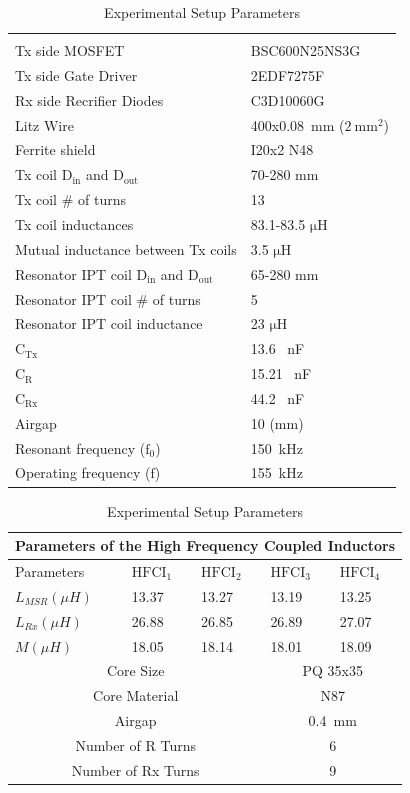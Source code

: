 \documentclass[journal]{IEEEtran}
\begin{document}
\begin{table}[h]
\centering
\caption{Experimental Setup Parameters}
\label{tab:experimetalsetupparameters}
\begin{tabular}{ll}
\hline \\
Tx side MOSFET       &   BSC600N25NS3G   \\
Tx side Gate Driver       &  2EDF7275F     \\
Rx side Recrifier Diodes       &  C3D10060G      \\
Litz Wire     & 400x0.08~mm ($\mathrm{2~mm^2}$)      \\
Ferrite shield   &   I20x2 N48     \\
Tx coil $\mathrm{D_{in}}$ and $\mathrm{D_{out}}$  &  70-280 mm\\
Tx coil \# of turns         &   13      \\
Tx coil inductances        &  83.1-83.5 $\mathrm{\mu H}$\\
Mutual inductance between Tx coils    &  3.5 $\mathrm{\mu H}$\\
Resonator IPT coil $\mathrm{D_{in}}$ and $\mathrm{D_{out}}$ &  65-280 mm\\
Resonator IPT coil \# of turns         &   5      \\
Resonator IPT coil inductance  & 23 $\mathrm{\mu H}$\\
$\mathrm{C_{Tx}}$         &   13.6 ~nF    \\
$\mathrm{C_{R}}$         &   15.21 ~nF   \\
$\mathrm{C_{Rx}}$        &   44.2 ~nF   \\
Airgap   &   10 (mm)     \\
Resonant frequency ($\mathrm{f_0}$)  &   150~kHz      \\
Operating frequency ($\mathrm{f}$)  &   155~kHz      \\
\hline
\end{tabular}

\begin{tabular}{lllll}
\\
\multicolumn{5}{c}{\textbf{Parameters of the High Frequency Coupled Inductors}} 
\\
\hline
\hline
Parameters & \textbf{$\mathrm{HFCI_{1}}$} &\textbf{$\mathrm{HFCI_{2}}$}& \textbf{$\mathrm{HFCI_{3}}$}& \textbf{$\mathrm{HFCI_{4}}$}\\ \hline
\textbf{$L_{MSR}(\mu H)$} & 13.37& 13.27  &  13.19&13.25 \\
\textbf{$L_{Rx}(\mu H)$}& 26.88&  26.85 &  26.89 &  27.07        \\
\textbf{$M(\mu H)$} & 18.05  & 18.14&  18.01 & 18.09   \\
\hline
\multicolumn{3}{c}{Core Size} & \multicolumn{2}{c}{PQ 35x35} \\
\multicolumn{3}{c}{Core Material} & \multicolumn{2}{c}{N87} \\
\multicolumn{3}{c}{Airgap} & \multicolumn{2}{c}{0.4~mm} \\
\multicolumn{3}{c}{Number of R Turns} & \multicolumn{2}{c}{6} \\
\multicolumn{3}{c}{Number of Rx Turns} & \multicolumn{2}{c}{9} \\
\hline
\end{tabular}


\end{table}
\end{document}
